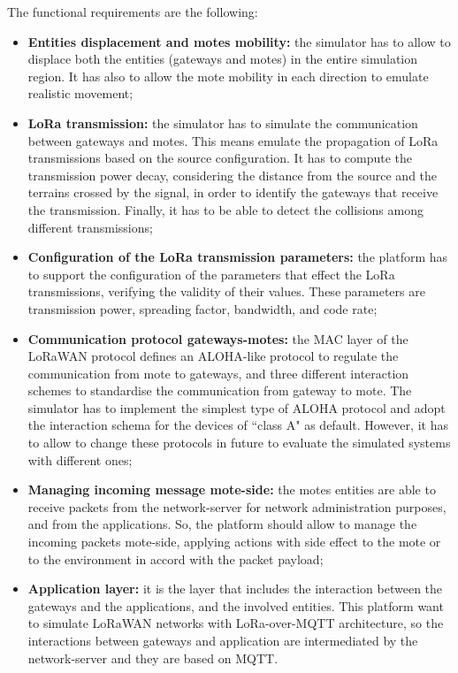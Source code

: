 The functional requirements are the following:
\begin{itemize}
    \item \textbf{Entities displacement and motes mobility:} the simulator has to allow to displace both the entities (gateways and motes) in the entire simulation region. It has also to allow the mote mobility in each direction to emulate realistic movement;
    \item \textbf{LoRa transmission:} the simulator has to simulate the communication between gateways and motes. This means emulate the propagation of LoRa transmissions based on the source configuration. It has to compute the transmission power decay, considering the distance from the source and the terrains crossed by the signal, in order to identify the gateways that receive the transmission. Finally, it has to be able to detect the collisions among different transmissions;
    \item \textbf{Configuration of the LoRa transmission parameters:} the platform has to support the configuration of the parameters that effect the LoRa transmissions, verifying the validity of their values. These parameters are transmission power, spreading factor, bandwidth, and code rate;
    \item \textbf{Communication protocol gateways-motes:} the MAC layer of the \mbox{LoRaWAN} protocol defines an ALOHA-like protocol to regulate the communication from mote to gateways, and three different interaction schemes to standardise the communication from gateway to mote. The simulator has to implement the simplest type of ALOHA protocol and adopt the interaction schema for the devices of ``class A" as default. However, it has to allow to change these protocols in future to evaluate the simulated systems with different ones;
    \item \textbf{Managing incoming message mote-side:} the motes entities are able to receive packets from the network-server for network administration purposes, and from the applications. So, the platform should allow to manage the incoming packets mote-side, applying actions with side effect to the mote or to the environment in accord with the packet payload;
    \item \textbf{Application layer:} it is the layer that includes the interaction between the gateways and the applications, and the involved entities. 
    This platform want to simulate LoRaWAN networks with LoRa-over-MQTT architecture, so the interactions between gateways and application are intermediated by the network-server and they are based on MQTT. 

\end{itemize}

